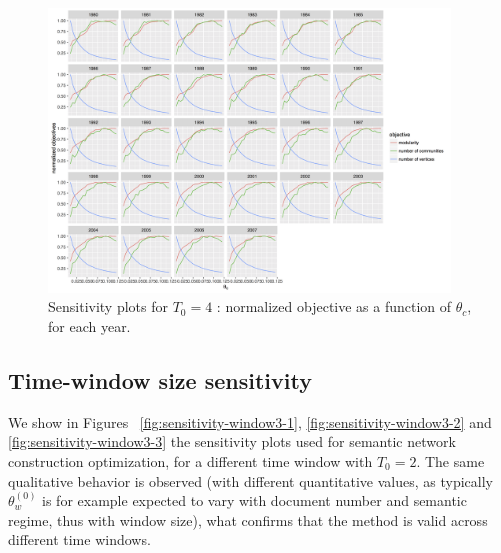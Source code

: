 \documentclass[article]{article}%
\begin{document}
\begin{figure}
	\centering
	\includegraphics[width=0.95\textwidth,height=\textwidth,angle=90]{figures/normalizedObjs-dispth_eth4_1e-5.png}
	\caption{Sensitivity plots for $T_0 = 4$ : normalized objective as a function of $\theta_c$, for each year.}
	\label{fig:ext-sensitivity-3}
\end{figure}



\subsection{Time-window size sensitivity}


We show in Figures ~\ref{fig:sensitivity-window3-1}, \ref{fig:sensitivity-window3-2} and \ref{fig:sensitivity-window3-3} the sensitivity plots used for semantic network construction optimization, for a different time window with $T_0 = 2$. The same qualitative behavior is observed (with different quantitative values, as typically $\theta_w^{(0)}$ is for example expected to vary with document number and semantic regime, thus with window size), what confirms that the method is valid across different time windows.
\end{document}
